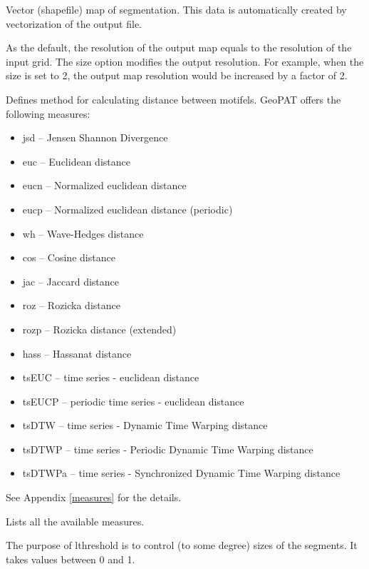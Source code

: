 
Vector (shapefile) map of segmentation.
This data is automatically created by vectorization of the output file.


As the default, the resolution of the output map equals to the resolution of the input grid.
The size option modifies the output resolution.
For example, when the size is set to 2, the output map resolution would be increased by a factor of 2.


Defines method for calculating distance between motifels. 
GeoPAT offers the following measures: 
\begin{itemize}
	\item jsd -- Jensen Shannon Divergence
	\item euc -- Euclidean distance
	\item eucn -- Normalized euclidean distance
	\item eucp -- Normalized euclidean distance (periodic)
	\item wh -- Wave-Hedges distance
	\item cos -- Cosine distance
	\item jac -- Jaccard distance
	\item roz -- Rozicka distance
	\item rozp -- Rozicka distance (extended)
	\item hass -- Hassanat distance
	\item tsEUC -- time series - euclidean distance
	\item tsEUCP -- periodic time series - euclidean distance
	\item tsDTW -- time series - Dynamic Time Warping distance
	\item tsDTWP -- time series - Periodic Dynamic Time Warping distance
	\item tsDTWPa -- time series - Synchronized Dynamic Time Warping distance
\end{itemize}
See Appendix \ref{measures} for the details.


Lists all the available measures. 


The purpose of lthreshold is to control (to some degree) sizes of the segments. 
It takes values between 0 and 1.


